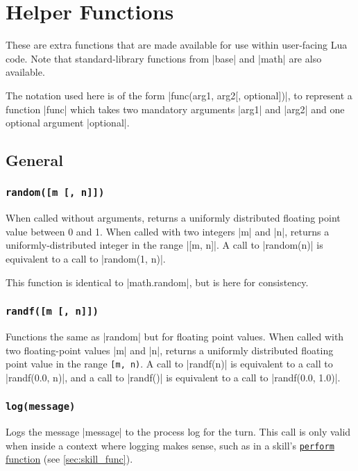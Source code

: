\chapter{Helper Functions}
\label{ch:func}

These are extra functions that are made available for use
within user-facing Lua code.
Note that standard-library functions from |base| and |math| are also available.

The notation used here is of the form |func(arg1, arg2[, optional])|,
to represent a function |func|
which takes two mandatory arguments |arg1| and |arg2|
and one optional argument |optional|.

\section{General}
\label{sec:func_general}

\subsection{\lstinline{random([m [, n]])}}
\label{sec:func_general_random}

When called without arguments,
returns a uniformly distributed floating point value between 0 and 1.
When called with two integers |m| and |n|,
returns a uniformly-distributed integer in the range |[m, n]|.
A call to |random(n)| is equivalent to a call to |random(1, n)|.

This function is identical to |math.random|, but is here for consistency.

\subsection{\lstinline{randf([m [, n]])}}
\label{sec:func_general_randf}

Functions the same as |random| but for floating point values.
When called with two floating-point values |m| and |n|,
returns a uniformly distributed floating point value in the range \lstinline{[m, n)}.
A call to |randf(n)| is equivalent to a call to |randf(0.0, n)|,
and a call to |randf()| is equivalent to a call to |randf(0.0, 1.0)|.

\subsection{\lstinline{log(message)}}

Logs the message |message| to the process log for the turn.
This call is only valid when inside a context where logging makes sense,
such as in a skill's \hyperref[sec:skill_func]{\lstinline{perform} function}
(see \autoref{sec:skill_func}).

